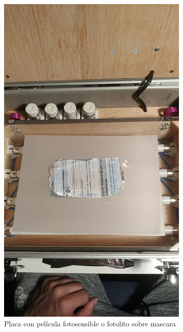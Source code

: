 \begin{figure}[!htb]
\begin{subfigure}[b]{.475\textwidth}
        \includegraphics[width=1\textwidth, trim={0 400 0 500}, clip]{tfg/figuras/06_prototipado/insolacion/placa_sobre_fotolito.png}
        \caption{Placa con película fotosensible o fotolito sobre mascara}
        \label{fig:tfg:06:placa_en_fotolito}
    \end{subfigure}%
    \hfill
    \begin{subfigure}[b]{.475\textwidth}
        \centering

\end{subfigure}
\end{figure}
